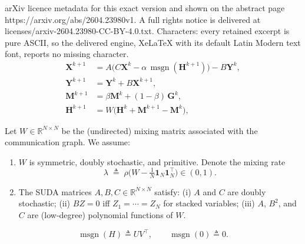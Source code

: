 \documentclass[10pt,a4paper]{amsart}
\begin{document}
arXiv licence metadata for this exact version and shown on the abstract page https://arxiv.org/abs/2604.23980v1. A full rights notice is delivered at licenses/arxiv-2604.23980-CC-BY-4.0.txt. Characters: every retained excerpt is pure ASCII, so the delivered engine, XeLaTeX with its default Latin Modern text font, reports no missing character.
\begin{equation}
\label{eq:sudamuon-framework}
\begin{aligned}
\mathbf{X}^{k+1} &= A\bigl(C\mathbf{X}^k - \alpha\,\operatorname{msgn}(\mathbf{H}^{k+1})\bigr) - B\mathbf{Y}^k,\\
\mathbf{Y}^{k+1} &= \mathbf{Y}^k + B\mathbf{X}^{k+1},\\
\mathbf{M}^{k+1} &= \beta\mathbf{M}^{k} + (1-\beta)\,\mathbf{G}^{k},\\
\mathbf{H}^{k+1} &= W\bigl(\mathbf{H}^k + \mathbf{M}^{k+1}-\mathbf{M}^{k}\bigr),
\end{aligned}
\end{equation}

\begin{assumption}
    \label{assump:network-suda}
    Let $W\in\mathbb{R}^{N\times N}$ be the (undirected) mixing matrix associated with the communication graph.
    We assume:
    \begin{enumerate}
        \vspace{-1mm}
        \item $W$ is symmetric, doubly stochastic, and primitive. Denote the mixing rate
        \[
            \lambda \;\triangleq\; \rho\Big(W-\tfrac{1}{N}\mathbf{1}_N\mathbf{1}_N^\top\Big)\in(0,1).
        \]
        \vspace{-1mm}
        \item The SUDA matrices $A,B,C\in\mathbb{R}^{N\times N}$ satisfy:
        (i) $A$ and $C$ are doubly stochastic; (ii) $BZ=0$ iff $Z_1=\cdots=Z_N$ for stacked variables;
        (iii) $A$, $B^2$, and $C$ are (low-degree) polynomial functions of $W$.
    \end{enumerate}
\end{assumption}

    \begin{equation}
    \label{eq:msgn}
        \operatorname{msgn}(H)\triangleq UV^\top,\qquad \operatorname{msgn}(0)\triangleq 0.
    \end{equation}
\end{document}
